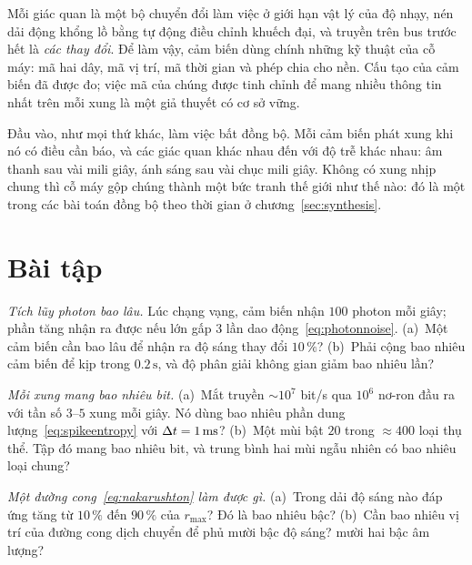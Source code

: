 \begin{keyblock}
\begin{proposition}
\label{prop:sensors}
Mỗi giác quan là một bộ chuyển đổi làm việc ở giới hạn vật lý của độ nhạy, nén dải động khổng lồ bằng tự động điều chỉnh khuếch đại, và truyền trên bus  trước hết là \emph{các thay đổi}. Để làm vậy, cảm biến dùng chính những kỹ thuật của cỗ máy: mã hai dây, mã vị trí, mã thời gian và phép chia cho nền. Cấu tạo của cảm biến đã được đo; việc mã của chúng được tinh chỉnh để mang nhiều thông tin nhất trên mỗi xung là một giả thuyết có cơ sở vững.
\end{proposition}
\end{keyblock}

Đầu vào, như mọi thứ khác, làm việc bất đồng bộ. Mỗi cảm biến phát xung khi nó có điều cần báo, và các giác quan khác nhau đến với độ trễ khác nhau: âm thanh sau vài mili giây, ánh sáng sau vài chục mili giây. Không có xung nhịp chung thì cỗ máy gộp chúng thành một bức tranh thế giới như thế nào: đó là một trong các bài toán đồng bộ theo thời gian ở chương~\ref{sec:synthesis}.

\section{Bài tập}

\begin{exercise}[\lvlA]
\label{ex:11:1}
\emph{Tích lũy photon bao lâu.} Lúc chạng vạng, cảm biến nhận $100$ photon mỗi giây; phần tăng nhận ra được nếu lớn gấp $3$ lần dao động~\eqref{eq:photonnoise}. (a)~Một cảm biến cần bao lâu để nhận ra độ sáng thay đổi $10\,\%$? (b)~Phải cộng bao nhiêu cảm biến để kịp trong $0.2\,\text{s}$, và độ phân giải không gian giảm bao nhiêu lần?
\end{exercise}

\begin{exercise}[\lvlA]
\label{ex:11:2}
\emph{Mỗi xung mang bao nhiêu bit.} (a)~Mắt truyền $\sim10^7$ bit/s qua $10^6$ nơ-ron đầu ra với tần số $3$--$5$ xung mỗi giây. Nó dùng bao nhiêu phần dung lượng~\eqref{eq:spikeentropy} với $\Delta t=1\,\text{ms}$? (b)~Một mùi bật $20$ trong $\approx400$ loại thụ thể. Tập đó mang bao nhiêu bit, và trung bình hai mùi ngẫu nhiên có bao nhiêu loại chung?
\end{exercise}

\begin{exercise}[\lvlB]
\label{ex:11:3}
\emph{Một đường cong~\eqref{eq:nakarushton} làm được gì.} (a)~Trong dải độ sáng nào đáp ứng tăng từ $10\,\%$ đến $90\,\%$ của $r_{\max}$? Đó là bao nhiêu bậc? (b)~Cần bao nhiêu vị trí của đường cong dịch chuyển để phủ mười bậc độ sáng? mười hai bậc âm lượng?
\end{exercise}

